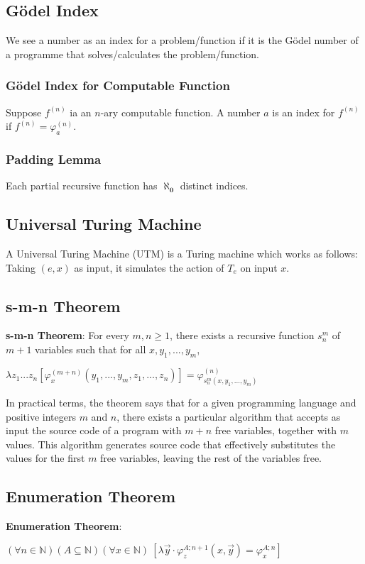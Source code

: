 \subsection{Gödel Index}
We see a number as an index for a problem/function if it is the Gödel number of a programme that solves/calculates the problem/function.
\subsubsection{Gödel Index for Computable Function}
Suppose $f^{(n)}$ ia an $n$-ary computable function. A number $a$ is an index for $f^{(n)}$ if $f^{(n)} = \varphi_a^{(n)}$.
\subsubsection{Padding Lemma}
Each partial recursive function has $\bm{\aleph_0}$ distinct indices.
\subsection{Universal Turing Machine}
A Universal Turing Machine (UTM) is a Turing machine which works as follows:\\
Taking $(e,x)$ as input, it simulates the action of $T_e$ on input $x$.

\subsection{s-m-n Theorem}
\textbf{s-m-n Theorem}: For every $m,n\geq1$, there exists a recursive function $s_n^m$ of $m+1$ variables such that for all $x,y_1,...,y_m$,
\begin{center}
	$
	\lambda z_1...z_n[\varphi_x^{(m+n)}(y_1,...,y_m,z_1,...,z_n)] = \varphi_{s_n^m(x,y_1,...,y_m)}^{(n)}
	$
\end{center}
In practical terms, the theorem says that for a given programming language and positive integers $m$ and $n$, there exists a particular algorithm that accepts as input the source code of a program with $m+n$ free variables, together with $m$ values. This algorithm generates source code that effectively substitutes the values for the first $m$ free variables, leaving the rest of the variables free.


\subsection{Enumeration Theorem}
\textbf{Enumeration Theorem}: 
\begin{center}
	$
	(\forall n\in \mathbb{N}) (A\subseteq \mathbb{N}) (\forall x\in \mathbb{N})
	~[\lambda \overrightarrow y\cdot \varphi_z^{A;n+1}(x,\overrightarrow y) = \varphi_x^{A;n} ]
	$
\end{center}

